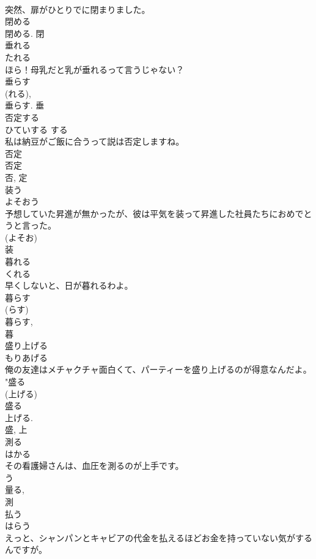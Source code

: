 \documentclass[8pt]{extreport}
\begin{document}
\begin{CJK}{UTF8}{min}
\\	突然、扉がひとりでに閉まりました。	
\\	閉める 
\\	閉める.	閉	
\\	垂れる	
\\	たれる	
\\	ほら！母乳だと乳が垂れるって言うじゃない？	
\\	垂らす 
\\	(れる), 
\\	垂らす.	垂	
\\	否定する	
\\	ひていする	する 
\\	私は納豆がご飯に合うって説は否定しますね。	
\\	否定 
\\	否定 
\\	否, 定	
\\	装う	
\\	よそおう	
\\	予想していた昇進が無かったが、彼は平気を装って昇進した社員たちにおめでとうと言った。	
\\	(よそお) 
\\	装	
\\	暮れる	
\\	くれる	
\\	早くしないと、日が暮れるわよ。	
\\	暮らす 
\\	(らす) 
\\	暮らす, 
\\	暮	
\\	盛り上げる	
\\	もりあげる	
\\	俺の友達はメチャクチャ面白くて、パーティーを盛り上げるのが得意なんだよ。	
\\	"盛る 
\\	(上げる) 
\\	盛る 
\\	上げる. 
\\	盛, 上	
\\	測る	
\\	はかる	
\\	その看護婦さんは、血圧を測るのが上手です。	
\\	う 
\\	量る, 
\\	測	
\\	払う	
\\	はらう	
\\	えっと、シャンパンとキャビアの代金を払えるほどお金を持っていない気がするんですが。	

\end{CJK}
\end{document}
